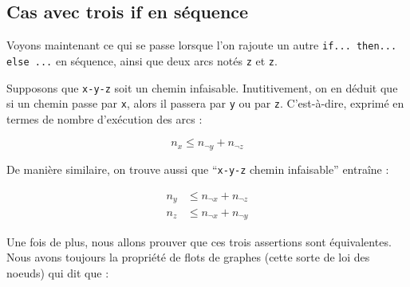 \documentclass[french]{article}
\begin{document}
  \subsection{Cas avec trois if en séquence}
  
  \begin{minipage}[c]{.45\linewidth}
  Voyons maintenant ce qui se passe lorsque l'on rajoute un autre \texttt{if... then... else ...} en séquence, ainsi que deux arcs notés \texttt{z} et \texttt{\textlnot z}.

  Supposons que \texttt{x-y-z} soit un chemin infaisable. Inutitivement, on en déduit que si un chemin passe par \texttt{x}, alors il passera par \texttt{\textlnot y} ou par \texttt{\textlnot z}. C'est-à-dire, exprimé en termes de nombre d'exécution des arcs :

  \[n_x \leq n_{\neg y} + n_{\neg z} \]

  De manière similaire, on trouve aussi que ``\texttt{x-y-z} chemin infaisable'' entraîne :

  \begin{align*}
    n_y &\leq n_{\neg x} + n_{\neg z} \\
    n_z &\leq n_{\neg x} + n_{\neg y}
  \end{align*}

  Une fois de plus, nous allons prouver que ces trois assertions sont équivalentes. Nous avons toujours la propriété de flots de graphes (cette sorte de loi des noeuds) qui dit que :
  \end{minipage}
  \hfill
\end{document}
